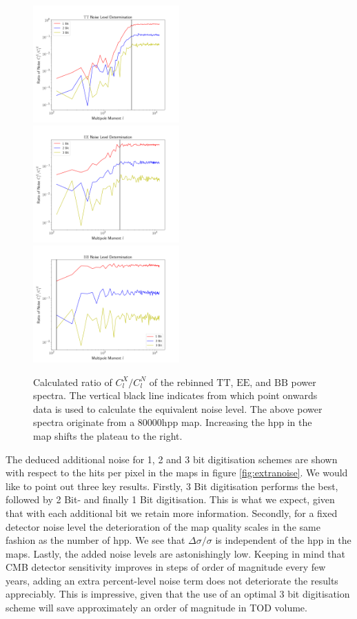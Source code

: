 \documentclass[apj]{emulateapj}
\begin{document}
\begin{figure}[htb]\centering
\includegraphics[width=0.5\textwidth,clip]{Plots/ttratio.png}
\includegraphics[width=0.5\textwidth,clip]{Plots/eeratio.png}
\includegraphics[width=0.5\textwidth,clip]{Plots/bbratio.png}
  \caption[Current ]{
  Calculated ratio of $C_l^X/C_l^N$ of the rebinned $\mathrm{TT}$, $\mathrm{EE}$, and $\mathrm{BB}$ power spectra. The vertical black line indicates from which point onwards data is used to calculate the equivalent noise level. The above power spectra originate from a $80000\mathrm{hpp}$ map. Increasing the hpp in the map shifts the plateau to the right.
\label{fig:clxcln}
}
\end{figure}


The deduced additional noise for 1, 2 and 3 bit digitisation schemes are shown with respect to the hits per pixel in the maps in figure \ref{fig:extranoise}. We would like to point out three key results. Firstly, 3 Bit digitisation performs the best, followed by 2 Bit- and finally 1 Bit digitisation. This is what we expect, given that with each additional bit we retain more information. Secondly, for a fixed detector noise level the deterioration of the map quality scales in the same fashion as the number of hpp. We see that $\Delta \sigma / \sigma$ is independent of the hpp in the maps. Lastly, the added noise levels are astonishingly low. Keeping in mind that CMB detector sensitivity improves in steps of order of magnitude every few years, adding an extra percent-level noise term does not deteriorate the results appreciably. This is impressive, given that the use of an optimal 3 bit digitisation scheme will save approximately an order of magnitude in TOD volume.
\end{document}
